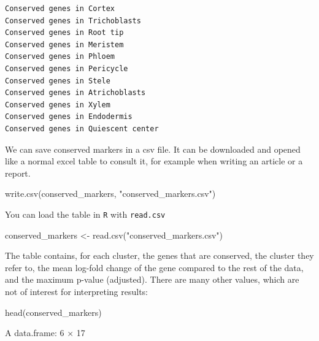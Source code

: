 \documentclass[
  letterpaper,
  DIV=11,
  numbers=noendperiod]{scrartcl}
\newenvironment{Shaded}{\begin{snugshade}}{\end{snugshade}}
\newcommand{\FunctionTok}[1]{\textcolor[rgb]{0.28,0.35,0.67}{#1}}
\newcommand{\NormalTok}[1]{\textcolor[rgb]{0.00,0.23,0.31}{#1}}
\newcommand{\OtherTok}[1]{\textcolor[rgb]{0.00,0.23,0.31}{#1}}
\newcommand{\StringTok}[1]{\textcolor[rgb]{0.13,0.47,0.30}{#1}}
\begin{document}
\begin{verbatim}
Conserved genes in Cortex
Conserved genes in Trichoblasts
Conserved genes in Root tip
Conserved genes in Meristem
Conserved genes in Phloem
Conserved genes in Pericycle
Conserved genes in Stele
Conserved genes in Atrichoblasts
Conserved genes in Xylem
Conserved genes in Endodermis
Conserved genes in Quiescent center
\end{verbatim}

We can save conserved markers in a csv file. It can be downloaded and
opened like a normal excel table to consult it, for example when writing
an article or a report.

\begin{Shaded}
\begin{Highlighting}[]
\FunctionTok{write.csv}\NormalTok{(conserved\_markers, }\StringTok{"conserved\_markers.csv"}\NormalTok{)}
\end{Highlighting}
\end{Shaded}

You can load the table in \texttt{R} with \texttt{read.csv}

\begin{Shaded}
\begin{Highlighting}[]
\NormalTok{conserved\_markers }\OtherTok{\textless{}{-}} \FunctionTok{read.csv}\NormalTok{(}\StringTok{"conserved\_markers.csv"}\NormalTok{)}
\end{Highlighting}
\end{Shaded}

The table contains, for each cluster, the genes that are conserved, the
cluster they refer to, the mean log-fold change of the gene compared to
the rest of the data, and the maximum p-value (adjusted). There are many
other values, which are not of interest for interpreting results:

\begin{Shaded}
\begin{Highlighting}[]
\FunctionTok{head}\NormalTok{(conserved\_markers)}
\end{Highlighting}
\end{Shaded}

A data.frame: 6 × 17
\end{document}
